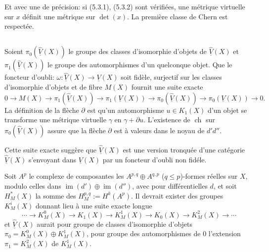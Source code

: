 \documentclass[12pt,a4paper]{article}
\theoremstyle{plain}
\theoremstyle{definition}
\DeclareMathOperator{\ch}{ch}
\DeclareMathOperator{\im}{im}
\begin{document}
Et avec une de pr\'ecision: si (5.3.1), (5.3.2) sont v\'erifi\'ees, une m\'etrique
virtuelle sur $x$ d\'efinit une m\'etrique sur $\det(x)$. La premi\`ere classe de Chern
est respect\'ee.

\subsection{}

Soient $\pi_0(\widehat{\underline{V}}(X))$ le groupe des classes d'isomorphie d'objets de
$\widehat{\underline{V}}(X)$ et $\pi_1(\widehat{\underline{V}}(X))$ le groupe des automorphismes d'un quelconque objet. Que le
foncteur d'oubli: $\omega: \widehat{\underline{V}}(X) \to \underline{V}(X)$ soit fid\`ele, surjectif sur les classes d'isomorphie
d'objets et de fibre $M(X)$ fournit une suite exacte
\begin{equation}\label{eq:5.4.1}
0 \to M(X) \to \pi_1(\widehat{\underline{V}}(X)) \to \pi_1(\underline{V}(X)) \to \pi_0(\widehat{\underline{V}}(X)) \to \pi_0(\underline{V}(X)) \to 0 .
\end{equation}
La d\'efinition de la fl\`eche $\partial$ est qu'un automorphisme $u \in K_1(X)$ d'un objet se transforme une m\'etrique
virtuelle $\gamma$ en $\gamma + \partial u$. L'existence de $\ch$ sur $\pi_0(\widehat{\underline{V}}(X))$ assure que la fl\`eche
$\partial$ est \`a valeurs dans le noyau de $d'd''$.

Cette suite exacte sugg\`ere que $\widehat{\underline{V}}(X)$ est une version tronqu\'ee d'une cat\'egorie
$\underline{\widehat{V}}(X)$ s'envoyant dans $\underline{V}(X)$ par un foncteur d'oubli non fid\'ele.

Soit $A^p$ le complexe de composantes les $A^{p,q} \oplus A^{q,p}$ ($q \leq p$)-formes r\'eelles
sur $X$, modulo celles dans $\im(d') \oplus \im(d'')$, avec pour diff\'erentielles $d$, et soit
$H^*_M(X)$ la somme des $H^{p,q}_M := H^k(A^p)$. Il devrait exister des groupes $K_M^i(X)$
donnant lieu \`a une suite exacte longue
\begin{equation}\label{eq:5.4.2}
\cdots \to K_M^0(X) \to K_1(X) \to K_M^1(X) \to K_0(X) \to K_M^2(X) \to \cdots
\end{equation}
et $\underline{\widehat{V}}(X)$ aurait pour groupe de classes d'isomorphie d'objets $\pi_0 = K_M^0(X) \oplus K^1_M(X)$,
pour groupe des automorphismes de $0$ l'extension $\pi_1 = K^2_M(X)$ de $K^1_M(X)$.

\subsection{}
\end{document}
